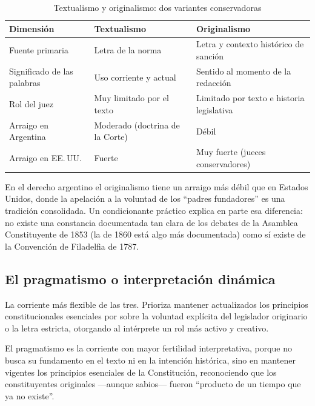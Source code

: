 \documentclass[12pt,oneside]{book}
\begin{document}
\begin{table}[H]
\centering
\caption{Textualismo y originalismo: dos variantes conservadoras}
\begin{tabularx}{\textwidth}{@{}lXX@{}}
\toprule
\textbf{Dimensión} & \textbf{Textualismo} & \textbf{Originalismo} \\
\midrule
Fuente primaria & Letra de la norma & Letra y contexto histórico de sanción \\
Significado de las palabras & Uso corriente y actual & Sentido al momento de la redacción \\
Rol del juez & Muy limitado por el texto & Limitado por texto e historia legislativa \\
Arraigo en Argentina & Moderado (doctrina de la Corte) & Débil \\
Arraigo en EE.\,UU. & Fuerte & Muy fuerte (jueces conservadores) \\
\bottomrule
\end{tabularx}
\end{table}

En el derecho argentino el originalismo tiene un arraigo más débil que en Estados
Unidos, donde la apelación a la voluntad de los ``padres fundadores'' es una
tradición consolidada. Un condicionante práctico explica en parte esa diferencia:
no existe una constancia documentada tan clara de los debates de la Asamblea
Constituyente de 1853 (la de 1860 está algo más documentada) como sí existe de la
Convención de Filadelfia de 1787.

\subsection{El pragmatismo o interpretación dinámica}

\begin{defbox}[: Pragmatismo]
La corriente más flexible de las tres. Prioriza mantener actualizados los
principios constitucionales esenciales por sobre la voluntad explícita del
legislador originario o la letra estricta, otorgando al intérprete un rol más
activo y creativo.
\end{defbox}

El pragmatismo es la corriente con mayor fertilidad interpretativa, porque no busca
su fundamento en el texto ni en la intención histórica, sino en mantener vigentes
los principios esenciales de la Constitución, reconociendo que los constituyentes
originales —aunque sabios— fueron ``producto de un tiempo que ya no existe''.
\end{document}
